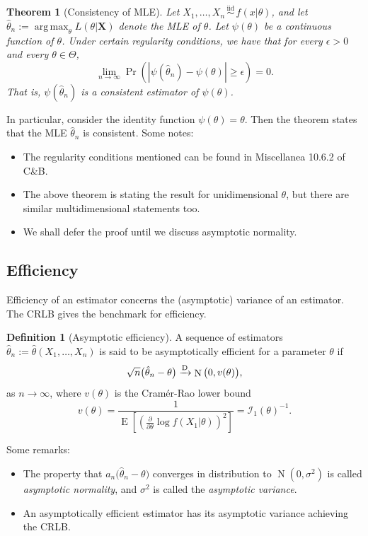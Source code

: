 \documentclass[
]{book}
\providecommand{\tightlist}{%
  \setlength{\itemsep}{0pt}\setlength{\parskip}{0pt}}
\newcommand{\bX}{{\boldsymbol X}}
\DeclareMathOperator{\E}{E}
\DeclareMathOperator{\N}{N}
\newcommand{\iid}{\,\overset{\text{iid}}{\sim}\,}
\newcommand{\cI}{{\mathcal I}}
\DeclareMathOperator*{\argmax}{arg\,max}
\newtheorem{theorem}{Theorem}[chapter]
\theoremstyle{definition}
\newtheorem{definition}{Definition}[chapter]
\theoremstyle{definition}
\theoremstyle{definition}
\theoremstyle{definition}
\theoremstyle{remark}
\begin{document}
\begin{theorem}[Consistency of MLE]
\protect\hypertarget{thm:consistentmle}{}\label{thm:consistentmle}Let \(X_1,\dots,X_n \iid f(x|\theta)\), and let \(\hat\theta_n:=\argmax_\theta L(\theta|\bX)\) denote the MLE of \(\theta\). Let \(\psi(\theta)\) be a continuous function of \(\theta\). Under certain regularity conditions, we have that for every \(\epsilon >0\) and every \(\theta\in\Theta\),
\[
\lim_{n\to\infty} \Pr(|\psi(\hat\theta_n) - \psi(\theta)| \geq \epsilon) = 0.
\]
That is, \(\psi(\hat\theta_n)\) is a consistent estimator of \(\psi(\theta)\).
\end{theorem}

In particular, consider the identity function \(\psi(\theta)=\theta\). Then the theorem states that the MLE \(\hat\theta_n\) is consistent. Some notes:

\begin{itemize}
\tightlist
\item
  The regularity conditions mentioned can be found in Miscellanea 10.6.2 of C\&B.
\item
  The above theorem is stating the result for unidimensional \(\theta\), but there are similar multidimensional statements too.
\item
  We shall defer the proof until we discuss asymptotic normality.
\end{itemize}

\hypertarget{efficiency}{%
\subsection{Efficiency}\label{efficiency}}

Efficiency of an estimator concerns the (asymptotic) variance of an estimator.
The CRLB gives the benchmark for efficiency.

\begin{definition}[Asymptotic efficiency]
A sequence of estimators \(\hat\theta_n := \hat\theta(X_1,\dots,X_n)\) is said to be asymptotically efficient for a parameter \(\theta\) if
\[
\sqrt n \big(\hat\theta_n - \theta \big) \xrightarrow{\text D} \N\big(0, v(\theta)\big),
\]
as \(n\to\infty\), where \(v(\theta)\) is the Cramér-Rao lower bound
\[
v(\theta) = \frac{1}{\E\left[\left(\frac{\partial}{\partial \theta} \log f(X_1|\theta) \right)^2\right]} = \cI_1(\theta)^{-1}.
\]
\end{definition}

Some remarks:

\begin{itemize}
\tightlist
\item
  The property that \(a_n \big(\hat\theta_n - \theta \big)\) converges in distribution to \(\N(0,\sigma^2)\) is called \emph{asymptotic normality}, and \(\sigma^2\) is called the \emph{asymptotic variance}.
\item
  An asymptotically efficient estimator has its asymptotic variance achieving the CRLB.
\end{itemize}
\end{document}
